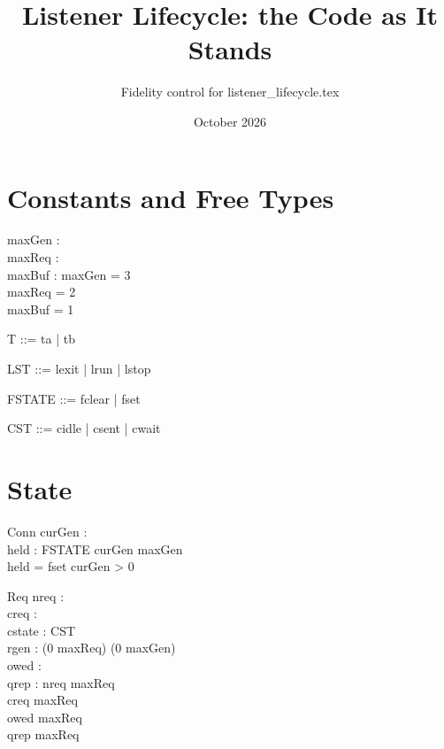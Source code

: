 \documentclass[a4paper,10pt,fleqn]{article}
\begin{document}
\title{Listener Lifecycle: the Code as It Stands}
\author{Fidelity control for listener\_lifecycle.tex}
\date{October 2026}
\maketitle

\section{Constants and Free Types}

\begin{axdef}
  maxGen : \nat \\
  maxReq : \nat \\
  maxBuf : \nat
\where
  maxGen = 3 \\
  maxReq = 2 \\
  maxBuf = 1
\end{axdef}

\begin{zed}
  T ::= ta | tb
\end{zed}

\begin{zed}
  LST ::= lexit | lrun | lstop
\end{zed}

\begin{zed}
  FSTATE ::= fclear | fset
\end{zed}

\begin{zed}
  CST ::= cidle | csent | cwait
\end{zed}

\section{State}

\begin{schema}{Conn}
  curGen : \nat \\
  held : FSTATE
\where
  curGen \leq maxGen \\
  held = fset \implies curGen > 0
\end{schema}

\begin{schema}{Req}
  nreq : \nat \\
  creq : \nat \\
  cstate : CST \\
  rgen : (0 \upto maxReq) \fun (0 \upto maxGen) \\
  owed : \power \nat \\
  qrep : \power \nat
\where
  nreq \leq maxReq \\
  creq \leq maxReq \\
  owed  \upto maxReq \\
  qrep  \upto maxReq
\end{schema}
\end{document}
